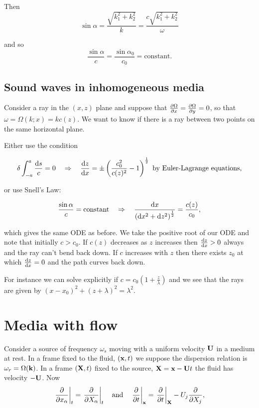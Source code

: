 \documentclass{notes}
\newcommand{\vk}{\vect{k}}
\begin{document}
Then
\[
\sin \alpha = \frac{\sqrt{k_1^2 + k_2^2}}{k} =
\frac{c \sqrt{k_1^2 + k_2^2}}{\omega}
\]

and so
\begin{equation}\label{eq:snellray}
\frac{\sin \alpha}{c} = \frac{\sin \alpha_0}{c_0} = \text{constant.}
\end{equation}

\subsection{Sound waves in inhomogeneous media}

Consider a ray in the $(x,z)$ plane and suppose that
$\frac{\partial \Omega}{\partial x} = \frac{\partial \Omega}{\partial y} = 0$, so that
$\omega = \Omega(k;x) = k c(z)$.  We want to know if there is a ray
between two points on the same horizontal plane.

\vspace{1.5in}

Either use the condition

\[
\delta \int_{-a}^a \frac{\mathrm{d} s}{c} = 0 \quad \Rightarrow \quad
\frac{\mathrm{d} z}{\mathrm{d} x} = \pm \left( \frac{c_0^2}{c(z)^2} - 1
\right)^{\frac{1}{2}} \text{ by Euler-Lagrange equations,}
\]

\vspace{1in}

or use Snell's Law:

\[
\frac{\sin \alpha}{c} = \text{constant} \quad \Rightarrow \quad
\frac{\mathrm{d} x}{\left( \mathrm{d} x^2 + \mathrm{d} z^2 \right)^{\frac{1}{2}}}
 = \frac{c(z)}{c_0},
\]

which gives the same ODE as before.  We take the positive root of our
ODE and note that initially $c > c_0$.  If $c(z)$ decreases as $z$
increases then $\frac{\mathrm{d} z}{\mathrm{d} x} > 0$ always and the ray can't bend back
down.  If $c$ increases with $z$ then there exists $z_0$ at which
$\frac{\mathrm{d} z}{\mathrm{d} x} = 0$ and the path curves back down.

For instance we can solve explicitly if $c = c_0 \left( 1+
  \tfrac{z}{\lambda} \right)$ and we see that the rays are given by
$(x-x_0)^2 + (z + \lambda)^2 = \lambda^2$. 

\section{Media with flow}

Consider a source of frequency $\omega_s$ moving with a uniform
velocity $\mathbf{U}$ in a medium at rest.  In a frame fixed to the
fluid, $(\mathbf{x},t)$ we suppose the dispersion relation is $\omega_r
= \Omega(\vk)$.  In a frame $(\mathbf{X},t)$ fixed to the source,
$\mathbf{X} = \mathbf{x} - \mathbf{U} t$ the fluid has velocity $- \mathbf{U}$.  Now
\[
\left. \frac{\partial }{\partial x_\alpha} \right|_t = \left. \frac{\partial }{\partial X_\alpha} \right|_t
\quad \text{and} \quad
\left. \frac{\partial }{\partial t} \right|_{\mathbf{x}} = \left. \frac{\partial }{\partial t}\right|_{\mathbf{X}}
 - U_j \frac{\partial }{\partial X_j},
\]
\end{document}
